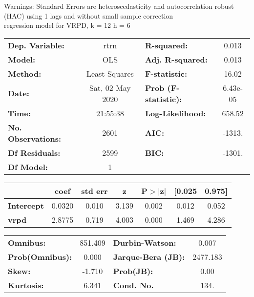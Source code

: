 Warnings: \newline
 [1] Standard Errors are heteroscedasticity and autocorrelation robust (HAC) using 1 lags and without small sample correction\\ 

regression model for VRPD, k = 12 h = 6\begin{center}
\begin{tabular}{lclc}
\toprule
\textbf{Dep. Variable:}    &       rtrn       & \textbf{  R-squared:         } &     0.013   \\
\textbf{Model:}            &       OLS        & \textbf{  Adj. R-squared:    } &     0.013   \\
\textbf{Method:}           &  Least Squares   & \textbf{  F-statistic:       } &     16.02   \\
\textbf{Date:}             & Sat, 02 May 2020 & \textbf{  Prob (F-statistic):} &  6.43e-05   \\
\textbf{Time:}             &     21:55:38     & \textbf{  Log-Likelihood:    } &    658.52   \\
\textbf{No. Observations:} &        2601      & \textbf{  AIC:               } &    -1313.   \\
\textbf{Df Residuals:}     &        2599      & \textbf{  BIC:               } &    -1301.   \\
\textbf{Df Model:}         &           1      & \textbf{                     } &             \\
\bottomrule
\end{tabular}
\begin{tabular}{lcccccc}
                   & \textbf{coef} & \textbf{std err} & \textbf{z} & \textbf{P$> |$z$|$} & \textbf{[0.025} & \textbf{0.975]}  \\
\midrule
\textbf{Intercept} &       0.0320  &        0.010     &     3.139  &         0.002        &        0.012    &        0.052     \\
\textbf{vrpd}      &       2.8775  &        0.719     &     4.003  &         0.000        &        1.469    &        4.286     \\
\bottomrule
\end{tabular}
\begin{tabular}{lclc}
\textbf{Omnibus:}       & 851.409 & \textbf{  Durbin-Watson:     } &    0.007  \\
\textbf{Prob(Omnibus):} &   0.000 & \textbf{  Jarque-Bera (JB):  } & 2477.183  \\
\textbf{Skew:}          &  -1.710 & \textbf{  Prob(JB):          } &     0.00  \\
\textbf{Kurtosis:}      &   6.341 & \textbf{  Cond. No.          } &     134.  \\
\bottomrule
\end{tabular}
\end{center}


